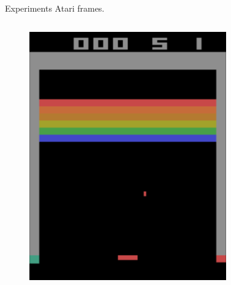\begin{frame}{Experiments}
    Atari frames.
    \begin{columns}[c,onlytextwidth]
        \begin{figure}
            \includegraphics[width=\textwidth]{images/atari-sequence-0.png}
        \end{figure}
        \begin{figure}

\end{figure}
\end{columns}
\end{frame}

